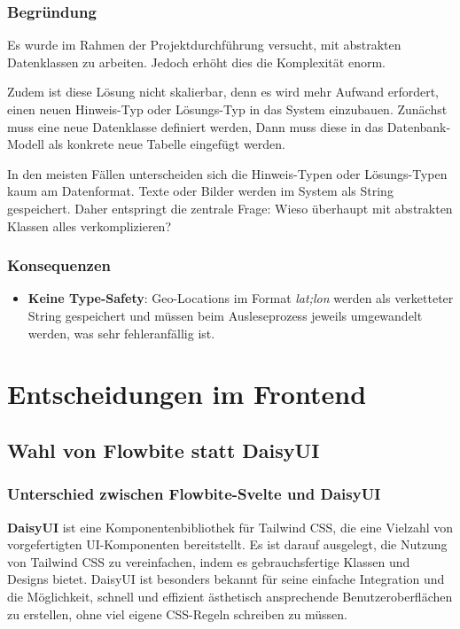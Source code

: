 \subsubsection{Begründung}

Es wurde im Rahmen der Projektdurchführung versucht, mit abstrakten Datenklassen zu arbeiten. Jedoch erhöht dies die Komplexität enorm.

Zudem ist diese Lösung nicht skalierbar, denn es wird mehr Aufwand erfordert, einen neuen Hinweis-Typ oder Lösungs-Typ in das System einzubauen. Zunächst muss eine neue Datenklasse definiert werden, Dann muss diese in das Datenbank-Modell als konkrete neue Tabelle eingefügt werden.

In den meisten Fällen unterscheiden sich die Hinweis-Typen oder Lösungs-Typen kaum am Datenformat. Texte oder Bilder werden im System als String gespeichert. Daher entspringt die zentrale Frage: Wieso überhaupt mit abstrakten Klassen alles verkomplizieren?

\subsubsection{Konsequenzen}

\begin{itemize}
    \item \textbf{Keine Type-Safety}: Geo-Locations im Format \textit{lat;lon} werden als verketteter String gespeichert und müssen beim Ausleseprozess jeweils umgewandelt werden, was sehr fehleranfällig ist.
\end{itemize}

\section{Entscheidungen im Frontend}

\subsection{Wahl von Flowbite statt DaisyUI} \label{appendix:adr:daisy}

\subsubsection{Unterschied zwischen Flowbite-Svelte und DaisyUI}

\textbf{DaisyUI} ist eine Komponentenbibliothek für Tailwind CSS, die eine Vielzahl von vorgefertigten UI-Komponenten bereitstellt. Es ist darauf ausgelegt, die Nutzung von Tailwind CSS zu vereinfachen, indem es gebrauchsfertige Klassen und Designs bietet. DaisyUI ist besonders bekannt für seine einfache Integration und die Möglichkeit, schnell und effizient ästhetisch ansprechende Benutzeroberflächen zu erstellen, ohne viel eigene CSS-Regeln schreiben zu müssen. 

